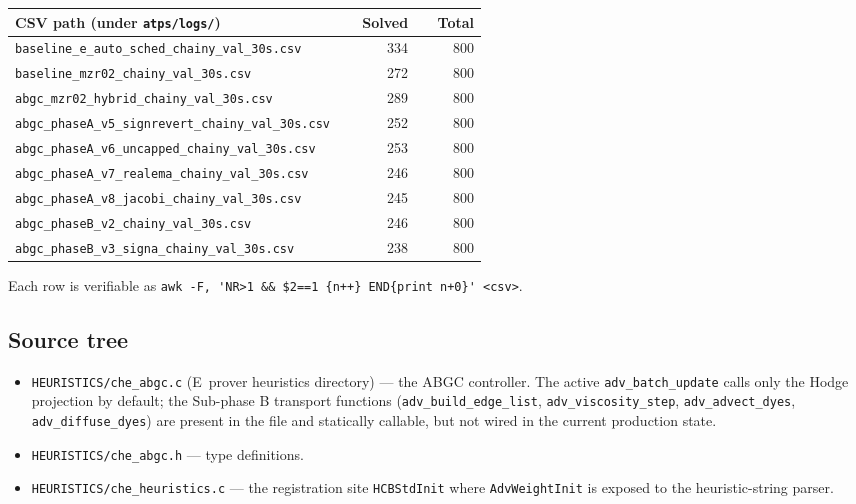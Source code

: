 \documentclass[11pt]{article}
\newcommand{\lpath}[1]{\texttt{\nolinkurl{#1}}}
\newcommand{\lid}[1]{{\ttfamily\nolinkurl{#1}}}
\begin{document}
\begin{longtable}{L{0.55\linewidth} r r}
\toprule
CSV path (under \lpath{atps/logs/}) & Solved & Total \\
\midrule
\endhead
\lpath{baseline_e_auto_sched_chainy_val_30s.csv} & 334 & 800 \\
\lpath{baseline_mzr02_chainy_val_30s.csv} & 272 & 800 \\
\lpath{abgc_mzr02_hybrid_chainy_val_30s.csv} & 289 & 800 \\
\lpath{abgc_phaseA_v5_signrevert_chainy_val_30s.csv} & 252 & 800 \\
\lpath{abgc_phaseA_v6_uncapped_chainy_val_30s.csv} & 253 & 800 \\
\lpath{abgc_phaseA_v7_realema_chainy_val_30s.csv} & 246 & 800 \\
\lpath{abgc_phaseA_v8_jacobi_chainy_val_30s.csv} & 245 & 800 \\
\lpath{abgc_phaseB_v2_chainy_val_30s.csv} & 246 & 800 \\
\lpath{abgc_phaseB_v3_signa_chainy_val_30s.csv} & 238 & 800 \\
\bottomrule
\end{longtable}
Each row is verifiable as
\lid{awk -F, 'NR>1 \&\& \$2==1 \{n++\} END\{print n+0\}' <csv>}.

\subsection{Source tree}

\begin{itemize}
\item \lpath{HEURISTICS/che_abgc.c} (E~prover heuristics directory) ---
      the ABGC controller. The active \lid{adv_batch_update} calls only
      the Hodge projection by default; the Sub-phase B transport functions
      (\lid{adv_build_edge_list}, \lid{adv_viscosity_step},
      \lid{adv_advect_dyes}, \lid{adv_diffuse_dyes}) are present in the file
      and statically callable, but not wired in the current production state.
\item \lpath{HEURISTICS/che_abgc.h} --- type definitions.
\item \lpath{HEURISTICS/che_heuristics.c} --- the registration site
      \lid{HCBStdInit} where \lid{AdvWeightInit} is exposed to the
      heuristic-string parser.
\end{itemize}
\end{document}
